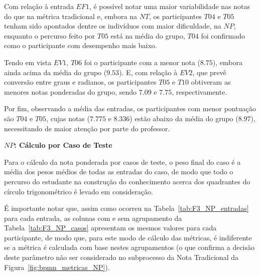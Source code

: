 Com relação à entrada $EF1$, é possível notar uma maior variabilidade nas notas do que na métrica tradicional e, embora na $NT$, os participantes $T04$ e $T05$ tenham sido apontados dentre os indivíduos com maior dificuldade, na $NP$, enquanto o percurso feito por $T05$ está na média do grupo, $T04$ foi confirmado como o participante com desempenho mais baixo.

Tendo em vista $EV1$, $T06$ foi o participante com a menor nota ($8.75$), embora ainda acima da média do grupo ($9.53$). E, com relação à $EV2$, que prevê conversão entre graus e radianos, os participantes $T05$ e $T10$ obtiveram as menores notas ponderadas do grupo, sendo $7.09$ e $7.75$, respectivamente.

Por fim, observando a média das entradas, os participantes com menor pontuação são $T04$ e $T05$, cujas notas ($7.775$ e $8.336$) estão abaixo da média do grupo ($8.97$), necessitando de maior atenção por parte do professor.

\textbf{$NP$: Cálculo por Caso de Teste}

Para o cálculo da nota ponderada por casos de teste, o peso final do caso é a média dos pesos médios de todas as entradas do caso, de modo que todo o percurso do estudante na construção do conhecimento acerca dos quadrantes do círculo trigonométrico é levado em consideração. 

É importante notar que, assim como ocorreu na Tabela~\ref{tab:F3_NP_entradas} para cada entrada, as colunas com e sem agrupamento da Tabela~\ref{tab:F3_NP_casos} apresentam os mesmos valores para cada participante, de modo que, para este modo de cálculo das métricas, é indiferente se a métrica é calculada com base nestes agrupamentos (o que confirma a decisão deste parâmetro não ser considerado no subprocesso da Nota Tradicional da Figura~\ref{fig:bpmn_metricas_NP}).

